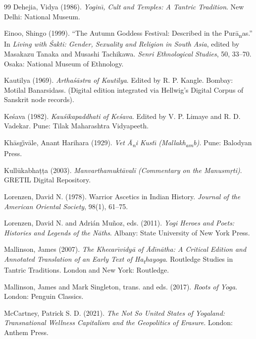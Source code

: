 \documentclass[11pt,twoside,letterpaper]{article}
\begin{document}
\begin{thebibliography}{99}
Dehejia, Vidya (1986). \textit{Yogin\={\i}, Cult and Temples: A Tantric Tradition}. New Delhi: National Museum.

Einoo, Shingo (1999). ``The Autumn Goddess Festival: Described in the Pur\={a}\textsubscript{n}as.'' In \textit{Living with \'Sakti: Gender, Sexuality and Religion in South Asia}, edited by Masakazu Tanaka and Musashi Tachikawa. \textit{Senri Ethnological Studies}, 50, 33--70. Osaka: National Museum of Ethnology.

Kautilya (1969). \textit{Arthaśāstra of Kautilya}. Edited by R. P. Kangle. Bombay: Motilal Banarsidass. (Digital edition integrated via Hellwig's Digital Corpus of Sanskrit node records).

Keśava (1982). \textit{Kauśikapaddhati of Keśava}. Edited by V. P. Limaye and R. D. Vadekar. Pune: Tilak Maharashtra Vidyapeeth.

Kh\={a}sg\={\={\i}}v\={a}le, Anant Harihara (1929). \textit{Vet \={A}\textsubscript{n}i Kust\={\i} (Mallakh\textsubscript{a}\textsubscript{m}b)}. Pune: Balodyan Press.

Kullūkabhaṭṭa (2003). \textit{Manvarthamuktāvalī (Commentary on the Manusmṛti)}. GRETIL Digital Repository.

Lorenzen, David N. (1978). Warrior Ascetics in Indian History. \textit{Journal of the American Oriental Society}, 98(1), 61--75.

Lorenzen, David N. and Adrián Muñoz, eds. (2011). \textit{Yogi Heroes and Poets: Histories and Legends of the Nāths}. Albany: State University of New York Press.

Mallinson, James (2007). \textit{The Khecar\={\i}vidy\={a} of \={A}d\={\i}n\={a}tha: A Critical Edition and Annotated Translation of an Early Text of Ha\textsubscript{t}hayoga}. Routledge Studies in Tantric Traditions. London and New York: Routledge.

Mallinson, James and Mark Singleton, trans. and eds. (2017). \textit{Roots of Yoga}. London: Penguin Classics.

McCartney, Patrick S. D. (2021). \textit{The Not So United States of Yogaland: Transnational Wellness Capitalism and the Geopolitics of Erasure}. London: Anthem Press.


\end{thebibliography}
\end{document}
